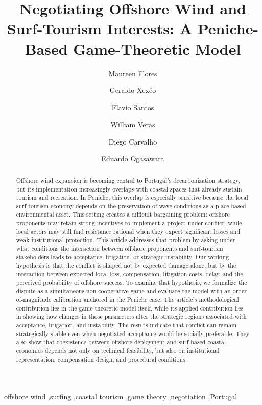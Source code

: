 \documentclass[final,times,authoryear]{elsarticle}
\begin{document}
\begin{frontmatter}

\title{Negotiating Offshore Wind and Surf-Tourism Interests: A Peniche-Based Game-Theoretic Model}

\author[first]{Maureen Flores}
\author[sec]{Geraldo Xexéo}
\author[third]{Flavio Santos}
\author[third]{William Veras}
\author[third]{Diego Carvalho}
\author[third]{Eduardo Ogasawara}



\begin{abstract}
Offshore wind expansion is becoming central to Portugal's decarbonization strategy, but its implementation increasingly overlaps with coastal spaces that already sustain tourism and recreation. In Peniche, this overlap is especially sensitive because the local surf-tourism economy depends on the preservation of wave conditions as a place-based environmental asset. This setting creates a difficult bargaining problem: offshore proponents may retain strong incentives to implement a project under conflict, while local actors may still find resistance rational when they expect significant losses and weak institutional protection. This article addresses that problem by asking under what conditions the interaction between offshore proponents and surf-tourism stakeholders leads to acceptance, litigation, or strategic instability. Our working hypothesis is that the conflict is shaped not by expected damage alone, but by the interaction between expected local loss, compensation, litigation costs, delay, and the perceived probability of offshore success. To examine that hypothesis, we formalize the dispute as a simultaneous non-cooperative game and evaluate the model with an order-of-magnitude calibration anchored in the Peniche case. The article's methodological contribution lies in the game-theoretic model itself, while its applied contribution lies in showing how changes in those parameters alter the strategic regions associated with acceptance, litigation, and instability. The results indicate that conflict can remain strategically stable even when negotiated acceptance would be socially preferable. They also show that coexistence between offshore deployment and surf-based coastal economies depends not only on technical feasibility, but also on institutional representation, compensation design, and procedural conditions.
\end{abstract}

\begin{keyword}
offshore wind \sep surfing \sep coastal tourism \sep game theory \sep negotiation \sep Portugal
\end{keyword}

\end{frontmatter}
\end{document}
